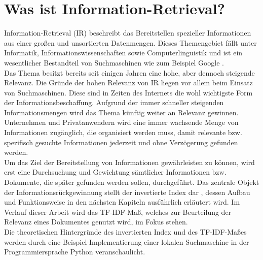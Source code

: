 \section{Was ist Information-Retrieval?}
Information-Retrieval (IR) beschreibt das Bereitstellen spezieller Informationen aus einer großen und unsortierten Datenmengen. Dieses Themengebiet fällt unter Informatik, Informationswissenschaften sowie Computerlinguistik und ist ein wesentlicher Bestandteil von Suchmaschinen wie zum Beispiel Google \cite{ir_wiki}.
\\
Das Thema besitzt bereits seit einigen Jahren eine hohe, aber dennoch steigende Relevanz. Die Gründe der hohen Relevanz von IR liegen vor allem beim Einsatz von Suchmaschinen. Diese sind in Zeiten des Internets die wohl wichtigste Form der Informationsbeschaffung. Aufgrund der immer schneller steigenden Informationsmengen wird das Thema künftig weiter an Relevanz gewinnen. Unternehmen und Privatanwendern wird eine immer wachsende Menge von Informationen zugänglich, die organisiert werden muss, damit relevante bzw. spezifisch gesuchte Informationen jederzeit und ohne Verzögerung gefunden werden.
\\
Um das Ziel der Bereitstellung von Informationen gewährleisten zu können, wird erst eine Durchsuchung und Gewichtung sämtlicher Informationen bzw. Dokumente, die später gefunden werden sollen, durchgeführt. Das zentrale Objekt der Informationsrückgewinnung stellt der invertierte Index dar \cite[S. 6]{IR_Intro_Cambridge}, dessen Aufbau und Funktionsweise in den nächsten Kapiteln ausführlich erläutert wird. Im Verlauf dieser Arbeit wird das TF-IDF-Maß, welches zur Beurteilung der Relevanz eines Dokumentes genutzt wird, im Fokus stehen.
\\
Die theoretischen Hintergründe des invertierten Index und des TF-IDF-Maßes werden durch eine Beispiel-Implementierung einer lokalen Suchmaschine in der Programmiersprache Python veranschaulicht.

